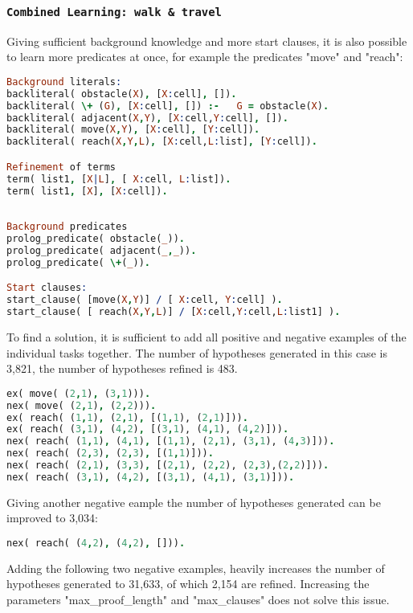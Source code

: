 \subsubsection{\texttt{Combined Learning: walk \& travel}}
Giving sufficient background knowledge and more start clauses, it is also possible to learn more predicates at once, for example the predicates "move" and "reach":
\begin{lstlisting}[label={lst:comb}, language=Prolog, caption=Combined learning of "move" \& "reach", belowcaptionskip=1cm]
Background literals:
backliteral( obstacle(X), [X:cell], []).
backliteral( \+ (G), [X:cell], []) :- 	G = obstacle(X).
backliteral( adjacent(X,Y), [X:cell,Y:cell], []).
backliteral( move(X,Y), [X:cell], [Y:cell]).
backliteral( reach(X,Y,L), [X:cell,L:list], [Y:cell]).

Refinement of terms
term( list1, [X|L], [ X:cell, L:list]).
term( list1, [X], [X:cell]).
	
		
Background predicates
prolog_predicate( obstacle(_)).
prolog_predicate( adjacent(_,_)).
prolog_predicate( \+(_)).       

Start clauses:
start_clause( [move(X,Y)] / [ X:cell, Y:cell] ).
start_clause( [ reach(X,Y,L)] / [X:cell,Y:cell,L:list1] ).  
\end{lstlisting}
To find a solution, it is sufficient to add all positive and negative examples of the individual tasks together. The number of hypotheses generated in this case is 3,821, the number of hypotheses refined is 483.
\begin{lstlisting}[label={lst:comb_ex}, language=Prolog, caption=Examples for combined learning of "move" \& "reach", belowcaptionskip=1cm]
ex( move( (2,1), (3,1))).
nex( move( (2,1), (2,2))). 
ex( reach( (1,1), (2,1), [(1,1), (2,1)])). 
ex( reach( (3,1), (4,2), [(3,1), (4,1), (4,2)])).
nex( reach( (1,1), (4,1), [(1,1), (2,1), (3,1), (4,3)])).
nex( reach( (2,3), (2,3), [(1,1)])).
nex( reach( (2,1), (3,3), [(2,1), (2,2), (2,3),(2,2)])).
nex( reach( (3,1), (4,2), [(3,1), (4,1), (3,1)])).
\end{lstlisting}
Giving another negative eample the number of hypotheses generated can be improved to 3,034:
\begin{lstlisting}[label={lst:comb_neg}, language=Prolog, caption=Additional example for combined learning of "move" \& "reach", belowcaptionskip=1cm]
nex( reach( (4,2), (4,2), [])).
\end{lstlisting}
Adding the following two negative examples, heavily increases the number of hypotheses generated to 31,633, of which 2,154 are refined. Increasing the parameters "max\_proof\_length" and "max\_clauses" does not solve this issue.
